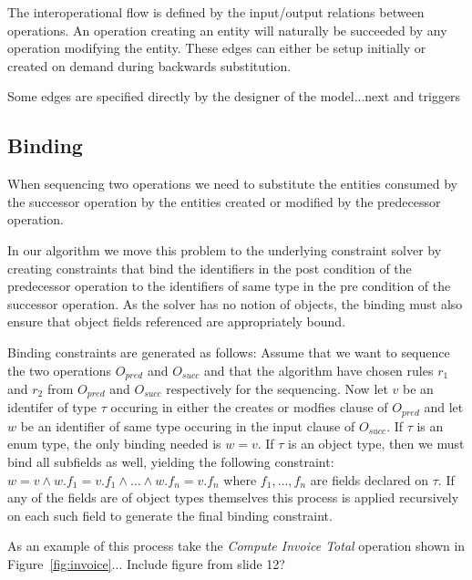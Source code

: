 The interoperational flow is defined by the input/output relations
between operations. An operation creating an entity will naturally be
succeeded by any operation modifying the entity. These edges can either
be setup initially or created on demand during backwards substitution. 

Some edges are specified directly by the designer of the model...next
and triggers

\subsection{Binding}
\label{sec:binding}

When sequencing two operations we need to substitute the entities
consumed by the successor operation by the entities created or
modified by the predecessor operation.

In our algorithm we move this problem to the underlying constraint
solver by creating constraints that bind the identifiers in the post
condition of the predecessor operation to the identifiers of same type
in the pre condition of the successor operation. As the solver has no
notion of objects, the binding must also ensure that object fields
referenced are appropriately bound.

Binding constraints are generated as follows: Assume that we want to
sequence the two operations $O_{pred}$ and $O_{succ}$ and that the
algorithm have chosen rules $r_1$ and $r_2$ from $O_{pred}$ and
$O_{succ}$ respectively for the sequencing. Now let $v$ be an
identifer of type $\tau$ occuring in either the creates or modfies
clause of $O_{pred}$ and let $w$ be an identifier of same type
occuring in the input clause of $O_{succ}$. If $\tau$ is an enum type,
the only binding needed is $w = v$. If $\tau$ is an object type, then
we must bind all subfields as well, yielding the following constraint:
$w = v \wedge w.f_1 = v.f_1 \wedge \ldots \wedge w.f_n = v.f_n$ where
$f_1, \ldots , f_n$ are fields declared on $\tau$. If any of the
fields are of object types themselves this process is applied
recursively on each such field to generate the final binding
constraint.

As an example of this process take the \emph{Compute Invoice Total}
operation shown in Figure~\ref{fig:invoice}... Include figure from
slide 12?
